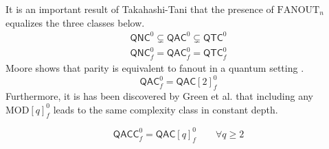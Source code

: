 %
It is an important result of Takahashi-Tani \cite{Takahashi2011} that the presence of
$\text{FANOUT}_n$ equalizes the three classes below.
%
\begin{eqnarray}
\textsf{QNC}^0 \subsetneq \textsf{QAC}^0 \subsetneq \textsf{QTC}^0\\
\textsf{QNC}^0_f = \textsf{QAC}^0_f = \textsf{QTC}^0_f
\end{eqnarray}
%
Moore shows that parity is equivalent to fanout in a quantum setting \cite{Moore1999}.
%
\begin{equation}
\textsf{QAC}^0_f = \textsf{QAC}[2]^0_f
\end{equation}
%
Furthermore, it is has been discovered by Green et al. that including any $\text{MOD}[q]^0_f$
leads to the same complexity class in constant depth.

\begin{equation}
\textsf{QACC}^0_f = \textsf{QAC}[q]^0_f \qquad \forall q \ge 2
\end{equation}